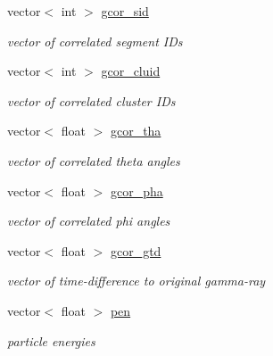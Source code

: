 \begin{DoxyCompactItemize}
\mbox{\label{classg__clx_a6623af3718b852bc91b64c9b72cd2033}} 
vector$<$ int $>$ \hyperlink{classg__clx_a6623af3718b852bc91b64c9b72cd2033}{gcor\+\_\+sid}
\begin{DoxyCompactList}\small\item\em vector of correlated segment I\+Ds \end{DoxyCompactList}\item 
\mbox{\label{classg__clx_ab7835b315dfc98870852f2295d6328b2}} 
vector$<$ int $>$ \hyperlink{classg__clx_ab7835b315dfc98870852f2295d6328b2}{gcor\+\_\+cluid}
\begin{DoxyCompactList}\small\item\em vector of correlated cluster I\+Ds \end{DoxyCompactList}\item 
\mbox{\label{classg__clx_a354120f267835f39caef20f2c9794a35}} 
vector$<$ float $>$ \hyperlink{classg__clx_a354120f267835f39caef20f2c9794a35}{gcor\+\_\+tha}
\begin{DoxyCompactList}\small\item\em vector of correlated theta angles \end{DoxyCompactList}\item 
\mbox{\label{classg__clx_a616679b8475ded8a5e4e6c393722f0bf}} 
vector$<$ float $>$ \hyperlink{classg__clx_a616679b8475ded8a5e4e6c393722f0bf}{gcor\+\_\+pha}
\begin{DoxyCompactList}\small\item\em vector of correlated phi angles \end{DoxyCompactList}\item 
\mbox{\label{classg__clx_ab11342c657d58c4c11a816249459539c}} 
vector$<$ float $>$ \hyperlink{classg__clx_ab11342c657d58c4c11a816249459539c}{gcor\+\_\+gtd}
\begin{DoxyCompactList}\small\item\em vector of time-\/difference to original gamma-\/ray \end{DoxyCompactList}\item 
\mbox{\label{classg__clx_a3fe0ed247618e9e9b9442c7d7b0d4e16}} 
vector$<$ float $>$ \hyperlink{classg__clx_a3fe0ed247618e9e9b9442c7d7b0d4e16}{pen}
\begin{DoxyCompactList}\small\item\em particle energies \end{DoxyCompactList}\item 

\end{DoxyCompactItemize}
